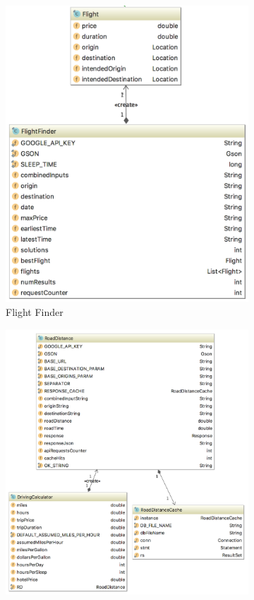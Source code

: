 \documentclass[11pt]{article}
\begin{document}
\begin{figure}
\centering
\begin{subfigure}{.4\textwidth}
\centering
  \includegraphics[width=1\linewidth]{FlightFinder.png}
  \caption{Flight Finder}
  \label{fig:flfinder}
\end{subfigure}%
\begin{subfigure}{.6\textwidth}
\centering
  \includegraphics[width=1\linewidth]{driveuml}

\end{subfigure}
\end{figure}
\end{document}
